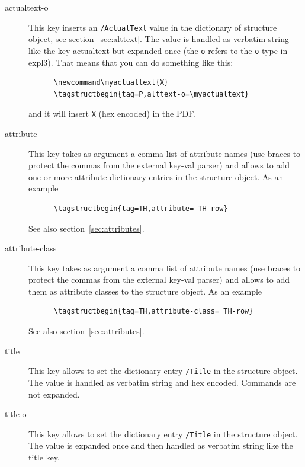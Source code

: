 \documentclass[DIV=12,parskip=half-,bibliography=totoc]{scrartcl}
\newcommand\PrintKeyName[1]{\textsf{#1}}
\newcommand\PDF{PDF}
\begin{document}
\begin{description}
  \item[\PrintKeyName{actualtext-o}]
   This key inserts an \texttt{/ActualText} value in the dictionary of structure object, see section~\ref{sec:alttext}. The value is handled as verbatim string like the key \PrintKeyName{actualtext} but expanded once (the \texttt{o} refers to the \texttt{o} type in expl3). That means that you can do something like this:


      \begin{lstlisting}
      \newcommand\myactualtext{X}
      \tagstructbegin{tag=P,alttext-o=\myactualtext}
      \end{lstlisting}



   and it will insert \verb+X+ (hex encoded)  in the \PDF{}.

   \item[\PrintKeyName{attribute}]
    This key takes as argument a comma list of attribute names (use braces to protect the commas from the external key-val parser) and allows to add one or more attribute dictionary entries in the structure object. As an example

      \begin{lstlisting}
      \tagstructbegin{tag=TH,attribute= TH-row}
      \end{lstlisting}

    See also section~\ref{sec:attributes}.

  \item[\PrintKeyName{attribute-class}]
   This key takes as argument a comma list of attribute names (use braces to protect the commas from the external key-val parser) and allows to add them as attribute classes to the structure object. As an example


      \begin{lstlisting}
      \tagstructbegin{tag=TH,attribute-class= TH-row}
      \end{lstlisting}

  See also section~\ref{sec:attributes}.

  \item[\PrintKeyName{title}]
  This key allows to set the dictionary entry \texttt{/Title} in the structure object. The value is handled as verbatim string and hex encoded. Commands are not expanded.

  \item[\PrintKeyName{title-o}]
  This key allows to set the dictionary entry \texttt{/Title} in the structure object.
  The value is expanded once and then handled as verbatim string like the \PrintKeyName{title} key.


\end{description}
\end{document}
